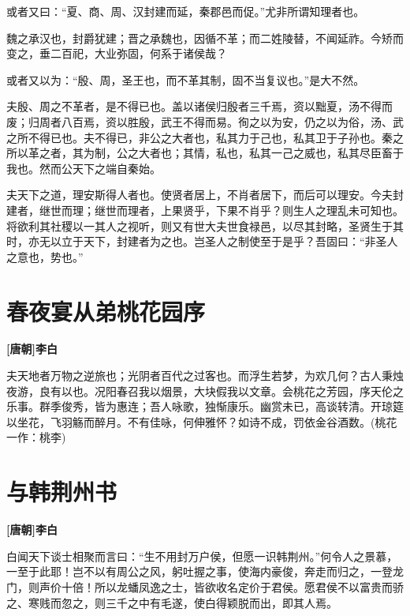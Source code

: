 \documentclass[UTF8,titlepage,oneside]{ctexbook}
\begin{document}
或者又曰：“夏、商、周、汉封建而延，秦郡邑而促。”尤非所谓知理者也。


魏之承汉也，封爵犹建；晋之承魏也，因循不革；而二姓陵替，不闻延祚。今矫而变之，垂二百祀，大业弥固，何系于诸侯哉？


或者又以为：“殷、周，圣王也，而不革其制，固不当复议也。”是大不然。


夫殷、周之不革者，是不得已也。盖以诸侯归殷者三千焉，资以黜夏，汤不得而废；归周者八百焉，资以胜殷，武王不得而易。徇之以为安，仍之以为俗，汤、武之所不得已也。夫不得已，非公之大者也，私其力于己也，私其卫于子孙也。秦之所以革之者，其为制，公之大者也；其情，私也，私其一己之威也，私其尽臣畜于我也。然而公天下之端自秦始。


夫天下之道，理安斯得人者也。使贤者居上，不肖者居下，而后可以理安。今夫封建者，继世而理；继世而理者，上果贤乎，下果不肖乎？则生人之理乱未可知也。将欲利其社稷以一其人之视听，则又有世大夫世食禄邑，以尽其封略，圣贤生于其时，亦无以立于天下，封建者为之也。岂圣人之制使至于是乎？吾固曰：“非圣人之意也，势也。”









\chapter*{春夜宴从弟桃花园序}
\begin{center}
	\textbf{[唐朝]李白}
\end{center}

夫天地者万物之逆旅也；光阴者百代之过客也。而浮生若梦，为欢几何？古人秉烛夜游，良有以也。况阳春召我以烟景，大块假我以文章。会桃花之芳园，序天伦之乐事。群季俊秀，皆为惠连；吾人咏歌，独惭康乐。幽赏未已，高谈转清。开琼筵以坐花，飞羽觞而醉月。不有佳咏，何伸雅怀？如诗不成，罚依金谷酒数。(桃花一作：桃李)


\chapter*{与韩荆州书}
\begin{center}
	\textbf{[唐朝]李白}
\end{center}

白闻天下谈士相聚而言曰：“生不用封万户侯，但愿一识韩荆州。”何令人之景慕，一至于此耶！岂不以有周公之风，躬吐握之事，使海内豪俊，奔走而归之，一登龙门，则声价十倍！所以龙蟠凤逸之士，皆欲收名定价于君侯。愿君侯不以富贵而骄之、寒贱而忽之，则三千之中有毛遂，使白得颖脱而出，即其人焉。
\end{document}
